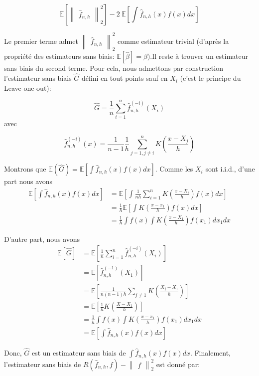 \documentclass[
]{article}
\begin{document}
\[
\mathbb{E}[\begin{Vmatrix}\hat {f}_{n,h}\end{Vmatrix}_2^2] -2~\mathbb{E}[\int \hat {f}_{n,h}(x)f(x)dx]
\]

Le premier terme admet
\(\begin{Vmatrix}\hat {f}_{n,h}\end{Vmatrix}_2^2\) comme estimateur
trivial (d'après la propriété des estimateurs sans biais:
\(\mathbb{E}[\hat {\beta}]=\beta)\).\newline Il reste à trouver un
estimateur sans biais du second terme. Pour cela, nous admettons par
construction l'estimateur sans biais \(\hat {G}\) défini en tout points
sauf en \(X_i\) (c'est le principe du Leave-one-out):

\[
\hat{G} = \frac{1}{n}\sum_{i=1}^n\hat {f}_{n,h}^{(-i)}(X_i)
\] avec

\[
  \hat {f}_{n,h}^{(-i)}(x)= \frac{1}{n-1}\frac{1}{h}\sum_{j=1,j\ne i}^nK(\frac{x-X_j}{h})
\]

Montrons que
\(\mathbb{E}(\hat{G})=\mathbb{E}[\int \hat{f}_{n,h}(x)f(x)dx]\).\newline
Comme les \(X_i\) sont i.i.d., d'une part nous avons \[
\begin{aligned}
\mathbb{E}[\int \hat {f}_{n,h}(x)f(x)dx]&= \mathbb{E}[\int \frac {1}{nh}\sum_{i=1}^nK(\frac {x-X_i}{h})f(x)dx]\\
&=\frac{1}{h}\mathbb{E}[\int K(\frac {x-x_1}{h})f(x)dx] \\
&=\frac{1}{h}\int f(x)\int K(\frac {x-X_1}{h})f(x_1)dx_1dx
\end{aligned}
\]

D'autre part, nous avons \[ 
\begin{aligned}
\mathbb{E}[\hat{G}]&=\mathbb{E}[\frac{1}{n}\sum_{i=1}^n\hat{f}_{n,h}^{(-i)}(X_i)]\\
&=\mathbb{E}[\hat{f}_{n,h}^{(-1)}(X_1)]\\
&=\mathbb{E}[\frac{1}{n(n-1)h}\sum_{j\ne 1}K(\frac{X_j-X_1}{h})]\\
&=\mathbb{E}[\frac{1}{h}K(\frac{X-X_1}{h})]\\
&=\frac{1}{h}\int f(x)\int K(\frac{x-x_1}{h})f(x_1)dx_1dx\\
&=\mathbb{E}[\int \hat{f}_{n,h}(x)f(x)dx] 
\end{aligned}
\]

Donc, \(\hat{G}\) est un estimateur sans biais de
\(\int\hat{f}_{n,h}(x)f(x)dx\). Finalement, l'estimateur sans biais de
\(R(\hat{f}_{n,h}, f)-\begin{Vmatrix}{f}\end{Vmatrix}_2^2\) est donné
par:
\end{document}
